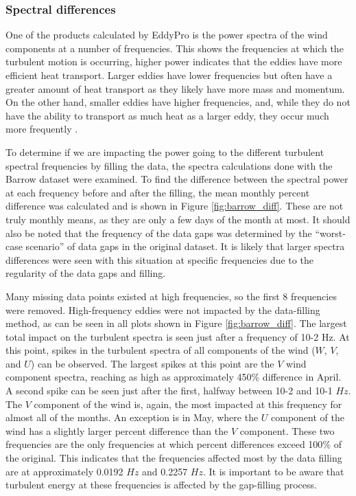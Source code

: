  \subsubsection{Spectral differences}
One of the products calculated by EddyPro is the power spectra of the wind components at a number of frequencies. This shows the frequencies at which the turbulent motion is occurring, higher power indicates that the eddies have more efficient heat transport. Larger eddies have lower frequencies but often have a greater amount of heat transport as they likely have more mass and momentum. On the other hand, smaller eddies have higher frequencies, and, while they do not have the ability to transport as much heat as a larger eddy, they occur much more frequently \citep{cohen:2015}. 

To determine if we are impacting the power going to the different turbulent spectral frequencies by filling the data, the spectra calculations done with the Barrow dataset were examined. To find the difference between the spectral power at each frequency before and after the filling, the mean monthly percent difference was calculated and is shown in Figure \ref{fig:barrow_diff}. These are not truly monthly means, as they are only a few days of the month at most. It should also be noted that the frequency of the data gaps was determined by the “worst-case scenario” of data gaps in the original dataset. It is likely that larger spectra differences were seen with this situation at specific frequencies due to the regularity of the data gaps and filling. 

Many missing data points existed at high frequencies, so the first 8 frequencies were removed. High-frequency eddies were not impacted by the data-filling method, as can be seen in all plots shown in Figure \ref{fig:barrow_diff}. The largest total impact on the turbulent spectra is seen just after a frequency of 10-2 Hz. At this point, spikes in the turbulent spectra of all components of the wind ($W$, $V$, and $U$) can be observed. The largest spikes at this point are the $V$ wind component spectra, reaching as high as approximately 450$\%$ difference in April. A second spike can be seen just after the first, halfway between 10-2 and 10-1 $Hz$. The $V$ component of the wind is, again, the most impacted at this frequency for almost all of the months. An exception is in May, where the $U$ component of the wind has a slightly larger percent difference than the $V$ component. These two frequencies are the only frequencies at which percent differences exceed 100$\%$ of the original. This indicates that the frequencies affected most by the data filling are at approximately 0.0192 $Hz$ and 0.2257 $Hz$. It is important to be aware that turbulent energy at these frequencies is affected by the gap-filling process.

